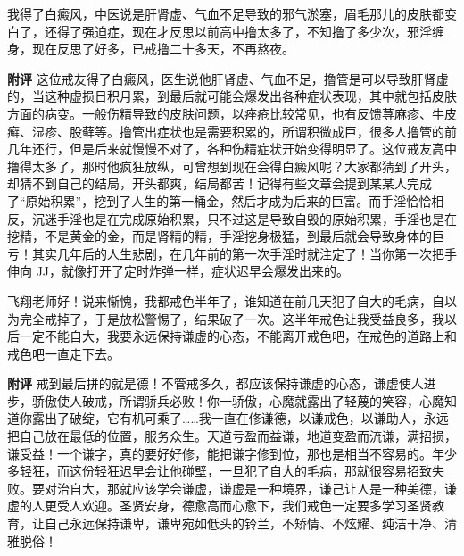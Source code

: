 \begin{case}
    我得了白癜风，中医说是肝肾虚、气血不足导致的邪气淤塞，眉毛那儿的皮肤都变白了，还得了强迫症，现在才反思以前高中撸太多了，不知撸了多少次，邪淫缠身，现在反思了好多，已戒撸二十多天，不再熬夜。

    \textbf{附评} 这位戒友得了白癜风，医生说他肝肾虚、气血不足，撸管是可以导致肝肾虚的，当这种虚损日积月累，到最后就可能会爆发出各种症状表现，其中就包括皮肤方面的病变。一般伤精导致的皮肤问题，以痤疮比较常见，也有反馈荨麻疹、牛皮癣、湿疹、股藓等。撸管出症状也是需要积累的，所谓积微成巨，很多人撸管的前几年还行，但是后来就慢慢不对了，各种伤精症状开始变得明显了。这位戒友高中撸得太多了，那时他疯狂放纵，可曾想到现在会得白癜风呢？大家都猜到了开头，却猜不到自己的结局，开头都爽，结局都苦！记得有些文章会提到某某人完成了“原始积累”，挖到了人生的第一桶金，然后才成为后来的巨富。而手淫恰恰相反，沉迷手淫也是在完成原始积累，只不过这是导致自毁的原始积累，手淫也是在挖精，不是黄金的金，而是肾精的精，手淫挖身极猛，到最后就会导致身体的巨亏！其实几年后的人生悲剧，在几年前的第一次手淫时就注定了！当你第一次把手伸向 JJ，就像打开了定时炸弹一样，症状迟早会爆发出来的。
\end{case}

\begin{case}
    飞翔老师好！说来惭愧，我都戒色半年了，谁知道在前几天犯了自大的毛病，自以为完全戒掉了，于是放松警惕了，结果破了一次。这半年戒色让我受益良多，我以后一定不能自大，我要永远保持谦虚的心态，不能离开戒色吧，在戒色的道路上和戒色吧一直走下去。

    \textbf{附评} 戒到最后拼的就是德！不管戒多久，都应该保持谦虚的心态，谦虚使人进步，骄傲使人破戒，所谓骄兵必败！你一骄傲，心魔就露出了轻蔑的笑容，心魔知道你露出了破绽，它有机可乘了……我一直在修谦德，以谦戒色，以谦助人，永远把自己放在最低的位置，服务众生。天道亏盈而益谦，地道变盈而流谦，满招损，谦受益！一个谦字，真的要好好修，能把谦字修到位，那也是相当不容易的。年少多轻狂，而这份轻狂迟早会让他碰壁，一旦犯了自大的毛病，那就很容易招致失败。要对治自大，那就应该学会谦虚，谦虚是一种境界，谦己让人是一种美德，谦虚的人更受人欢迎。圣贤安身，德愈高而心愈下，我们戒色一定要多学习圣贤教育，让自己永远保持谦卑，谦卑宛如低头的铃兰，不矫情、不炫耀、纯洁干净、清雅脱俗！
\end{case}

